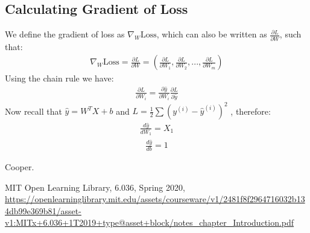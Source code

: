 \documentclass[11pt]{article}
\numberwithin{equation}{section}
\theoremstyle{definition}%
\begin{document}
\subsection{Calculating Gradient of Loss}

We define the gradient of loss as $\nabla_W \text{Loss}$, which can also be written as $\frac{\partial L}{\partial W}$, such that: 
\begin{align}
    \nabla_W \text{Loss} = \frac{\partial L}{\partial W} = \left( \frac{\partial L}{\partial W_1}, \frac{\partial L}{\partial W_2}, ..., \frac{\partial L}{\partial W_m} \right)
\end{align}
Using the chain rule we have:
\begin{align}
    \frac{\partial L}{\partial W_i} = \frac{\partial \hat{y}}{\partial W_i} \frac{\partial L}{\partial \hat{y}}
\end{align}
Now recall that $\hat{y} = W^{T}X + b$ and $L = \frac{1}{2} \sum{(y^{(i)} - \hat{y}^{(i)})^{2}}$ , therefore:
\begin{align}
    \frac{d \hat{y}}{dW_1} = X_1
\end{align}
\begin{align}
    \frac{d \hat{y}}{db} = 1
\end{align}

\begin{thebibliography}{2}
     Cooper.

     {MIT Open Learning Library, 6.036, Spring 2020, \url{https://openlearninglibrary.mit.edu/assets/courseware/v1/2481f8f2964716032b134db99e369b81/asset-v1:MITx+6.036+1T2019+type@asset+block/notes_chapter_Introduction.pdf}}

\end{thebibliography}
\end{document}
